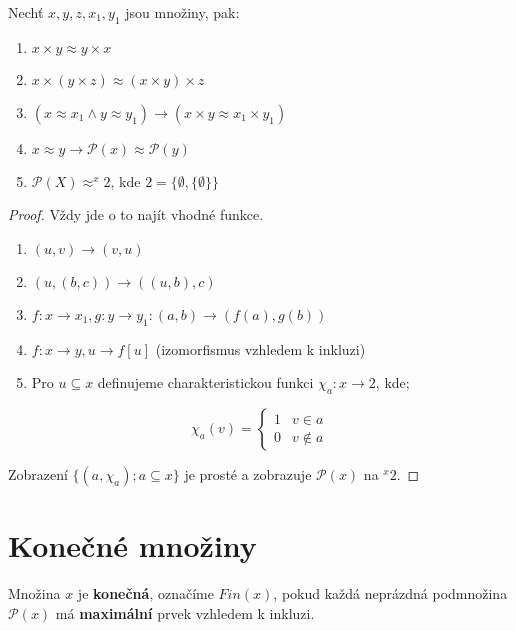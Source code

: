 \begin{lemma}
	Nechť $x,y,z,x_{1},y_{1}$ jsou množiny, pak:
	
	\begin{enumerate}
		\item $x \times y \approx y \times x$
		\item $x \times (y \times z) \approx (x \times y) \times z$
		\item $(x \approx x_{1} \land y \approx y_{1}) \rightarrow (x \times y \approx x_{1} \times y_{1})$
		\item $x \approx y \rightarrow \mathcal{P}(x) \approx \mathcal{P}(y)$
		\item $\mathcal{P}(X) \approx ^{x}2$, kde $2 = \{\emptyset,\{\emptyset\}\}$
	\end{enumerate}
\end{lemma}
 
\begin{proof}
	Vždy jde o to najít vhodné funkce.
	
	\begin{enumerate}
		\item $(u,v) \to (v,u)$
		\item $(u,(b,c)) \to ((u,b),c)$
		\item $f: x \to x_{1}, g: y \to y_{1}: (a,b) \to (f(a),g(b))$
		\item $f:x \to y, u \to f[u]$ (izomorfismus vzhledem k inkluzi)
		\item Pro $u \subseteq x$ definujeme charakteristickou funkci $\chi_{a}:x \to 2$, kde;
	\end{enumerate}
	
	$$
	\chi_{a}(v) =
	\left\{
	\begin{array}{ll}
		1 & v \in a \\
		0 & v \notin a
	\end{array}
	\right.
	$$
	
	Zobrazení $\{(a, \chi_{a}); a \subseteq x\}$ je prosté a zobrazuje $\mathcal{P}(x)$ na $^{x}2$.
\end{proof}

\section{Konečné množiny}

\begin{definice}[Tarski]
	Množina $x$ je \textbf{konečná}, označíme $Fin(x)$, pokud každá neprázdná podmnožina $\mathcal{P}(x)$ má \textbf{maximální} prvek vzhledem k inkluzi.
\end{definice}

